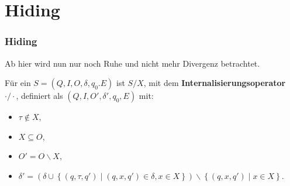 \section{Hiding}
\begin{frame}
  \frametitle{Hiding}
  Ab hier wird nun nur noch Ruhe und nicht mehr Divergenz betrachtet.
  \begin{Def}[Internalisierungsoperator]
    Für ein \EIO{} $S=(Q,I,O,\delta ,q_0.E)$ ist $S/X$, mit
    dem \textbf{Internalisierungsoperator} $\cdot /\cdot$,
    definiert als $(Q,I,O',\delta ', q_0,E)$ mit:
    \begin{itemize}
      \item $\tau \notin X$,
      \item $X\subseteq O$,
      \item $O'=O\backslash X$,
      \item $\delta '=\left(\delta\cup\left\{(q,\tau ,q')\mid (q,x,q')\in\delta
        ,x\in X\right\}\right)\backslash \left\{(q,x,q')\mid x\in X\right\}$.
    \end{itemize}
  \end{Def}
\end{frame}
